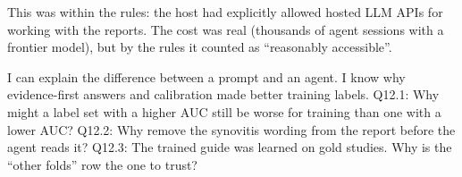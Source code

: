 \begin{watchout}
This was within the rules: the host had explicitly allowed hosted LLM APIs for working with the reports. The cost was
real (thousands of agent sessions with a frontier model), but by the rules it counted as ``reasonably accessible''.
\end{watchout}

\begin{checkpoint}
\begin{itemize}
\done I can explain the difference between a prompt and an agent.
\done I know why evidence-first answers and calibration made better training labels.
\quiz Q12.1: Why might a label set with a higher AUC still be worse for training than one with a lower AUC?
\quiz Q12.2: Why remove the synovitis wording from the report before the agent reads it?
\quiz Q12.3: The trained guide was learned on gold studies. Why is the ``other folds'' row the one to trust?
\end{itemize}
\end{checkpoint}
